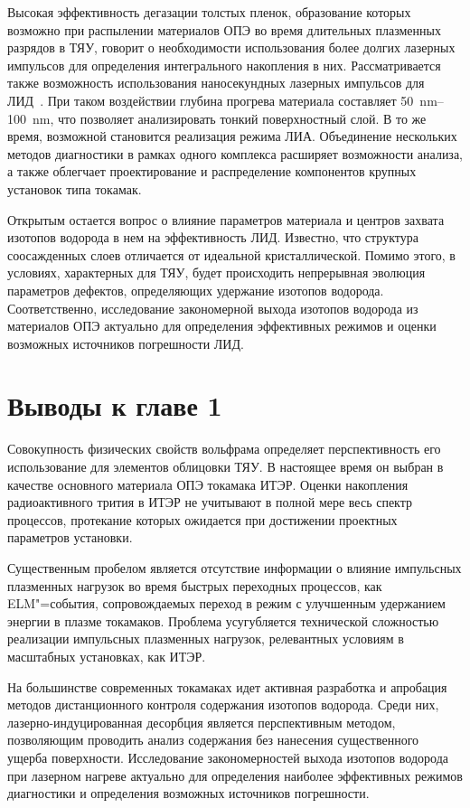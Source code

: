 Высокая эффективность дегазации толстых пленок, образование которых возможно при распылении материалов ОПЭ во время длительных плазменных разрядов в ТЯУ, говорит о необходимости использования более долгих лазерных импульсов для определения интегрального накопления в них. Рассматривается также возможность использования наносекундных лазерных импульсов для ЛИД~\cite{Medvedev2024, Gasparyan2021, Efimov2024}. При таком воздействии глубина прогрева материала составляет \SIrange{50}{100}{\nano\meter}, что позволяет анализировать тонкий поверхностный слой. В то же время, возможной становится реализация режима ЛИА. Объединение нескольких методов диагностики в рамках одного комплекса расширяет возможности анализа, а также облегчает проектирование и распределение компонентов крупных установок типа токамак.

Открытым остается вопрос о влияние параметров материала и центров захвата изотопов водорода в нем на эффективность ЛИД. Известно, что структура соосажденных слоев отличается от идеальной кристаллической. Помимо этого, в условиях, характерных для ТЯУ, будет происходить непрерывная эволюция параметров дефектов, определяющих удержание изотопов водорода. Соответственно, исследование закономерной выхода изотопов водорода из материалов ОПЭ актуально для определения эффективных режимов и оценки возможных источников погрешности ЛИД. 

\section{Выводы к главе 1}

Совокупность физических свойств вольфрама определяет перспективность его использование для элементов облицовки ТЯУ. В настоящее время он выбран в качестве основного материала ОПЭ токамака ИТЭР. Оценки накопления радиоактивного трития в ИТЭР не учитывают в полной мере весь спектр процессов, протекание которых ожидается при достижении проектных параметров установки. 

Существенным пробелом является отсутствие информации о влияние импульсных плазменных нагрузок во время быстрых переходных процессов, как ELM"=события, сопровождаемых переход в режим с улучшенным удержанием энергии в плазме токамаков. Проблема усугубляется технической сложностью реализации импульсных плазменных нагрузок, релевантных условиям в масштабных установках, как ИТЭР. 

На большинстве современных токамаках идет активная разработка и апробация методов дистанционного контроля содержания изотопов водорода. Среди них, лазерно-индуцированная десорбция является перспективным методом, позволяющим проводить анализ содержания без нанесения существенного ущерба поверхности. Исследование закономерностей выхода изотопов водорода при лазерном нагреве актуально для определения наиболее эффективных режимов диагностики и определения возможных источников погрешности.


\FloatBarrier
